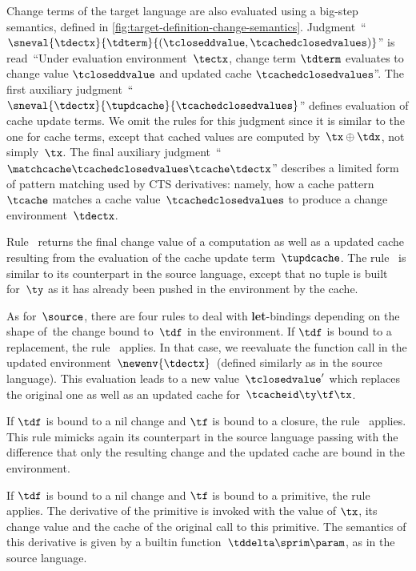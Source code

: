 Change terms of the target language are also evaluated using a
big-step semantics, defined in
\cref{fig:target-definition-change-semantics}.
Judgment~``$\sneval{\tdectx}{\tdterm}{(\tcloseddvalue,
  \tcachedclosedvalues)}$'' is read~``Under evaluation
environment~$\tectx$, change term $\tdterm$ evaluates to
change value $\tcloseddvalue$ and updated cache
$\tcachedclosedvalues$''. The first auxiliary
judgment~``$\sneval{\tdectx}{\tupdcache}{\tcachedclosedvalues}$''
defines evaluation of cache update terms. We omit the
rules for this judgment since it is similar to the one for cache terms,
except that cached values are computed by~$\tx \oplus \tdx$, not simply~$\tx$.
%
The final auxiliary
judgment~``$\matchcache\tcachedclosedvalues\tcache\tdectx$'' describes a limited
form of pattern matching used by CTS derivatives: namely,
how a cache pattern $\tcache$ matches a cache
value~$\tcachedclosedvalues$ to produce a change
environment~$\tdectx$.

Rule~ returns the final change value of a
computation as well as a updated cache resulting from the evaluation
of the cache update term~$\tupdcache$.
%
The rule~ is similar to its counterpart in the
source language, except that no tuple is built for~$\ty$ as it has
already been pushed in the environment by the cache.

As for~$\source$, there are four rules to deal with {\bf
  let}-bindings depending on the shape of~the change bound to~$\tdf$
in the environment.
%
If $\tdf$ is bound to a replacement, the rule~ applies.
In that case, we reevaluate the function call in the updated
environment~$\newenv{\tdectx}$~(defined similarly as in the source
language). This evaluation leads to a new value~$\tclosedvalue'$
which replaces the original one as well as an updated cache
for~$\tcacheid\ty\tf\tx$.

If $\tdf$ is bound to a nil change and $\tf$ is bound to a closure, the
rule~ applies. This rule mimicks again its
counterpart in the source language passing with the difference that
only the resulting change and the updated cache are bound in the
environment.

If $\tdf$ is bound to a nil change and $\tf$ is bound to a primitive, the
rule~ applies. The derivative of the
primitive is invoked with the value of $\tx$, its change value and the
cache of the original call to this primitive. The semantics of this
derivative is given by a builtin function~$\tddelta\sprim\param$, as
in the source language.


